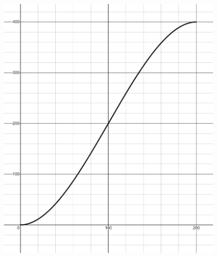 \begin{example}
\begin{solL}
    \end{solL}
\end{example}

\newpage

\begin{figure}[H]
    \centering
    \caption{} 
    \includegraphics[scale=0.75]{images/2ndDervConcavity/diminishingReturn_ex1_graph2.PNG} 

\end{figure}


